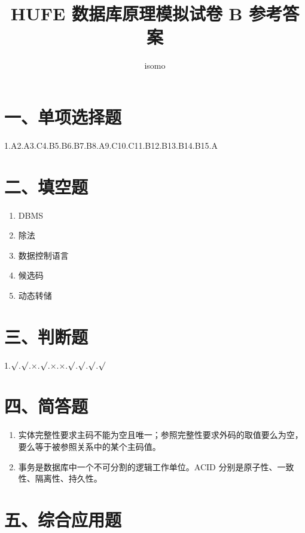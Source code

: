 \documentclass{../../note}
\title{HUFE 数据库原理模拟试卷 B 参考答案}
\author{isomo}
\begin{document}
\fontsize{12pt}{14.4pt}\selectfont
\maketitle

\section*{一、单项选择题}

1.A\quad 2.A\quad 3.C\quad 4.B\quad 5.B\quad 6.B\quad 7.B\quad 8.A\quad 9.C\quad 10.C\quad 11.B\quad 12.B\quad 13.B\quad 14.B\quad 15.A

\section*{二、填空题}

\begin{enumerate}
\item DBMS
\item 除法
\item 数据控制语言
\item 候选码
\item 动态转储
\end{enumerate}

\section*{三、判断题}

1.$\surd$.$\surd$.$\times$.$\surd$.$\times$.$\times$.$\surd$.$\surd$.$\surd$.$\surd$

\section*{四、简答题}

\begin{enumerate}[itemsep=0.8em]
\item 实体完整性要求主码不能为空且唯一；参照完整性要求外码的取值要么为空，要么等于被参照关系中的某个主码值。
\item 事务是数据库中一个不可分割的逻辑工作单位。ACID 分别是原子性、一致性、隔离性、持久性。
\end{enumerate}

\section*{五、综合应用题}
\end{document}
